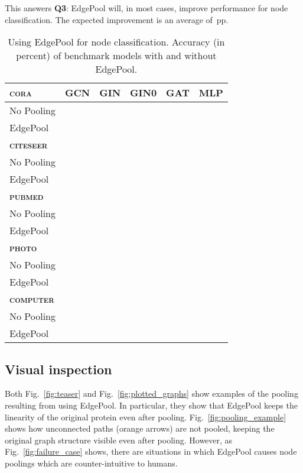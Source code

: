 \documentclass{article}
\newcommand{\figref}[1]{Fig.~\ref{#1}}
\newcommand{\edgepool}{EdgePool}
\newcommand{\datasetname}[1]{\textsc{#1}}
\newcommand{\cora}{\datasetname{cora}}
\newcommand{\citeseer}{\datasetname{citeseer}}
\newcommand{\pubmed}{\datasetname{pubmed}}
\newcommand{\photo}{\datasetname{photo}}
\newcommand{\computer}{\datasetname{computer}}
\newcommand{\pp}{\,\gls{pp}}
\begin{document}
This answers \textbf{Q3}: \edgepool{} will, in most cases, improve performance for node classification. The expected improvement is an average of \pp{}.

\begin{table}
	\centering
	\caption{Using \edgepool{} for node classification. Accuracy (in percent) of benchmark models with and without \edgepool{}.} 


\begin{tabular}{lrrrrr}
	\toprule
	\textbf{\cora{}} & GCN & GIN         & GIN0 & GAT & MLP \\ \midrule
	No Pooling &    &  &  &  &  \\
	\edgepool{} &    &  &       &  & \\
	
	\toprule
	\textbf{\citeseer{}} & &&&& \\ \midrule
	No Pooling &    &  &  &  &  \\
	\edgepool{} &    &  &       &  & \\
	
	\toprule
	\textbf{\pubmed{}} & &&&& \\ \midrule
	No Pooling &    &  &  &  & \\
	\edgepool{} &    &  &       &  & \\
	
	\toprule
	\textbf{\photo{}} & &&&& \\ \midrule
	No Pooling &    &  &  &  & \\
	\edgepool{} &    &  &       &  & \\
	
        \toprule
	\textbf{\computer{}} & &&&& \\ \midrule
	No Pooling &    &  &  &  & \\
	\edgepool{} &    &  &       &  & \\

\end{tabular} 	\label{tab:results_benchmarks_node}
\end{table}

\subsection{Visual inspection}

Both \figref{fig:teaser} and \figref{fig:plotted_graphs} show examples of the pooling resulting from using \edgepool{}. In particular, they show that \edgepool{} keeps the linearity of the original protein even after pooling. \figref{fig:pooling_example} shows how unconnected paths (orange arrows) are not pooled, keeping the original graph structure visible even after pooling. However, as \figref{fig:failure_case} shows, there are situations in which \edgepool{} causes node poolings which are counter-intuitive to humans.
\end{document}

